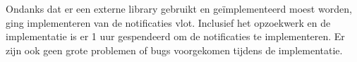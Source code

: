 Ondanks dat er een externe library gebruikt en geïmplementeerd moest worden, ging implementeren van de 
notificaties vlot. Inclusief het opzoekwerk en de implementatie is er 1 uur gespendeerd om de notificaties 
te implementeren. Er zijn ook geen grote problemen of bugs voorgekomen tijdens de implementatie.

